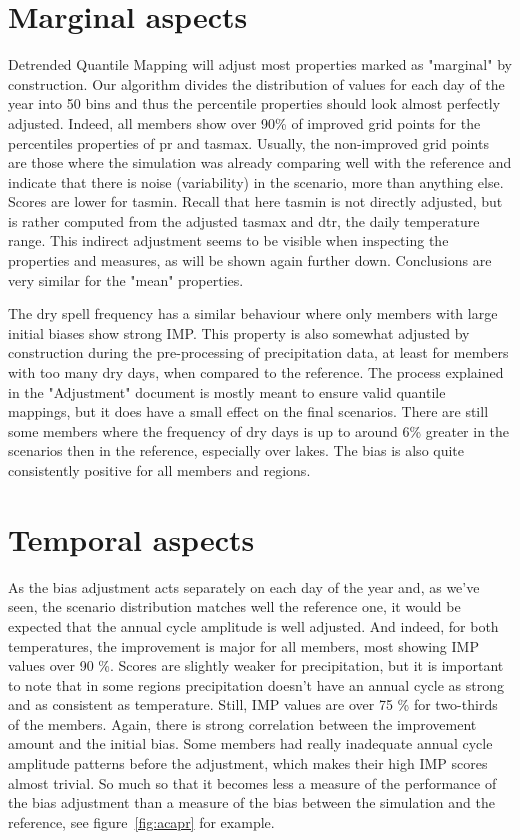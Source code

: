 \documentclass[letterpaper,10pt]{article}
\begin{document}
\section{Marginal aspects}
Detrended Quantile Mapping will adjust most properties marked as "marginal" by construction. Our algorithm divides the distribution of values for each day of the year into 50 bins and thus the percentile properties should look almost perfectly adjusted. Indeed, all members show over 90\% of improved grid points for the percentiles properties of pr and tasmax. Usually, the non-improved grid points are those where the simulation was already comparing well with the reference and indicate that there is noise (variability) in the scenario, more than anything else. Scores are lower for tasmin. Recall that here tasmin is not directly adjusted, but is rather computed from the adjusted tasmax and dtr, the daily temperature range. This indirect adjustment seems to be visible when inspecting the properties and measures, as will be shown again further down. Conclusions are very similar for the "mean" properties.

The dry spell frequency has a similar behaviour where only members with large initial biases show strong IMP. This property is also somewhat adjusted by construction during the pre-processing of precipitation data, at least for members with too many dry days, when compared to the reference. The process explained in the "Adjustment" document is mostly meant to ensure valid quantile mappings, but it does have a small effect on the final scenarios. There are still some members where the frequency of dry days is up to around 6\% greater in the scenarios then in the reference, especially over lakes. The bias is also quite consistently positive for all members and regions.

\section{Temporal aspects}
As the bias adjustment acts separately on each day of the year and, as we've seen, the scenario distribution matches well the reference one, it would be expected that the annual cycle amplitude is well adjusted. And indeed, for both temperatures, the improvement is major for all members, most showing IMP values over 90 \%. Scores are slightly weaker for precipitation, but it is important to note that in some regions precipitation doesn't have an annual cycle as strong and as consistent as temperature. Still, IMP values are over 75 \% for two-thirds of the members. Again, there is strong correlation between the improvement amount and the initial bias. Some members had really inadequate annual cycle amplitude patterns before the adjustment, which makes their high IMP scores almost trivial. So much so that it becomes less a measure of the performance of the bias adjustment than a measure of the bias between the simulation and the reference, see figure~\ref{fig:acapr} for example.
\end{document}
